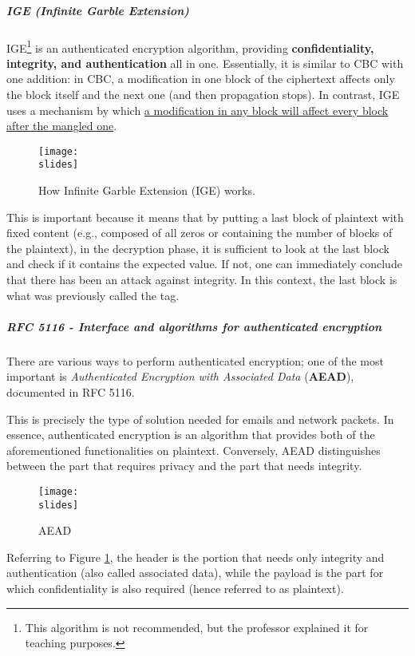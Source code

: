 \subparagraph*{IGE (Infinite Garble Extension)}

IGE\footnote{This algorithm is not recommended, but the professor explained it for teaching purposes.} is an authenticated encryption algorithm, providing \textbf{confidentiality, integrity, and authentication} all in one.
Essentially, it is similar to CBC with one addition: in CBC, a modification in one block of the ciphertext affects only the block itself and the next one (and then propagation stops). In contrast, IGE uses a mechanism by which \ul{a modification in any block will affect every block after the mangled one}.

\begin{figure}[h]
    \centering
    \texttt{[image: \\slides]}
    \caption{How Infinite Garble Extension (IGE) works.}
\end{figure}

This is important because it means that by putting a last block of plaintext with fixed content (e.g., composed of all zeros or containing the number of blocks of the plaintext), in the decryption phase, it is sufficient to look at the last block and check if it contains the expected value. If not, one can immediately conclude that there has been an attack against integrity. In this context, the last block is what was previously called the tag.


\subparagraph*{RFC 5116 - Interface and algorithms for authenticated encryption}
There are various ways to perform authenticated encryption; one of the most important is \textit{Authenticated Encryption with Associated Data} (\textbf{AEAD}), documented in RFC 5116.

This is precisely the type of solution needed for emails and network packets. In essence, authenticated encryption is an algorithm that provides both of the aforementioned functionalities on plaintext. Conversely, AEAD distinguishes between the part that requires privacy and the part that needs integrity.
\begin{figure}[h]
    \centering
    \texttt{[image: \\slides]}
    \caption{AEAD}
    \label{fig:AEAD}
\end{figure}

Referring to Figure \ref{fig:AEAD}, the header is the portion that needs only integrity and authentication (also called associated data), while the payload is the part for which confidentiality is also required (hence referred to as plaintext).

